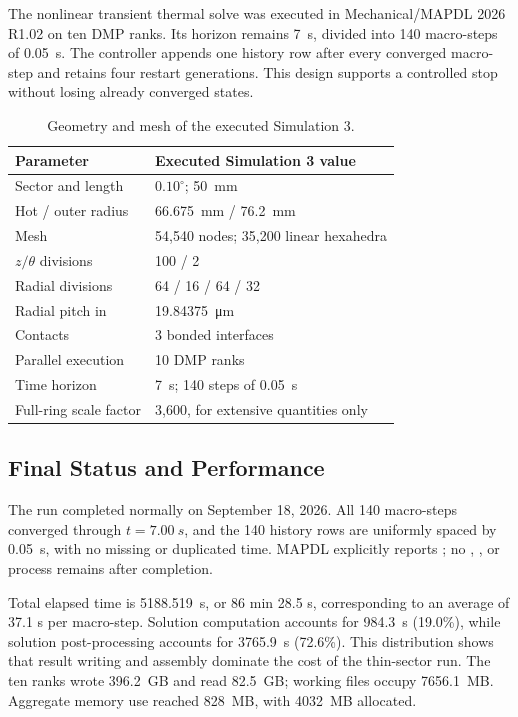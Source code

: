 \documentclass[oneside,openany]{amsdtx}
\begin{document}
The nonlinear transient thermal solve was executed in Mechanical/MAPDL 2026
R1.02 on ten DMP ranks. Its horizon remains \SI{7}{s}, divided into 140
macro-steps of \SI{0.05}{s}. The controller appends one history row after
every converged macro-step and retains four restart generations. This design
supports a controlled stop without losing already converged states.

\begin{table}[H]
\centering
\small
\renewcommand{\arraystretch}{1.15}
\begin{tabular}{L{0.43\textwidth}L{0.43\textwidth}}
\toprule
\textbf{Parameter} & \textbf{Executed Simulation 3 value} \\
\midrule
Sector and length & \(0.10^\circ\); \SI{50}{mm} \\
Hot / outer radius & \SI{66.675}{mm} / \SI{76.2}{mm} \\
Mesh & 54,540 nodes; 35,200 linear hexahedra \\
\(z/\theta\) divisions & 100 / 2 \\
Radial divisions & 64 / 16 / 64 / 32 \\
Radial pitch in  & \SI{19.84375}{\micro m} \\
Contacts & 3 bonded interfaces \\
Parallel execution & 10 DMP ranks \\
Time horizon & \SI{7}{s}; 140 steps of \SI{0.05}{s} \\
Full-ring scale factor & 3,600, for extensive quantities only \\
\bottomrule
\end{tabular}
\caption{Geometry and mesh of the executed Simulation 3.}
\label{tab:sim3-configuration}
\end{table}

\subsection{Final Status and Performance}

The run completed normally on September 18, 2026. All 140 macro-steps
converged through \(t=\SI{7.00}{s}\), and the 140 history rows are uniformly
spaced by \SI{0.05}{s}, with no missing or duplicated time. MAPDL explicitly
reports ; no , , or
 process remains after completion.

Total elapsed time is \SI{5188.519}{s}, or 86 min 28.5 s, corresponding to an
average of 37.1 s per macro-step. Solution computation accounts for
\SI{984.3}{s} (19.0\%), while solution post-processing accounts for
\SI{3765.9}{s} (72.6\%). This distribution shows that result writing and
assembly dominate the cost of the thin-sector run. The ten ranks wrote
\SI{396.2}{GB} and read \SI{82.5}{GB}; working files occupy
\SI{7656.1}{MB}. Aggregate memory use reached \SI{828}{MB}, with
\SI{4032}{MB} allocated.
\end{document}
